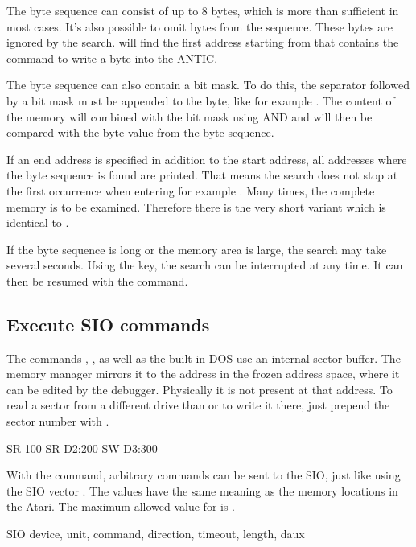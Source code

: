 The byte sequence can consist of up to 8 bytes, which is more than sufficient
in most cases. It's also possible to omit bytes from the sequence. These bytes
are ignored by the search.
 will find the first address starting from  that
contains the command  to write a byte into the ANTIC.

The byte sequence can also contain a bit mask. To do this, the separator
\fcmd{\&} followed by a bit mask must be appended to the byte, like for example
. The content of the memory will combined with the bit mask using
AND and will then be compared with the byte value from the byte sequence.

If an end address is specified in addition to the start address, all addresses
where the byte sequence is found are printed. That means the search does not
stop at the first occurrence when entering for example
.
Many times, the complete memory is to be examined. Therefore there is the very short
variant  which is identical to
.

If the byte sequence is long or the memory area is large, the search may take
several seconds. Using the  key, the search can be interrupted at
any time. It can then be resumed with the \fcmd{/} command.

\subsection{Execute SIO commands}

The commands , ,  as well as the built-in DOS use an
internal sector buffer. The memory manager mirrors it to the address 
in the frozen address space, where it can be edited by the debugger.
Physically it is not present at that address. To read a sector from a different
drive than  or to write it there, just prepend the sector number with
.
\begin{fcode}
SR 100
SR D2:200
SW D3:300
\end{fcode}

With the  command, arbitrary commands can be sent to the SIO, just
like using the SIO vector . The values have the same meaning as the
memory locations  in the Atari. The maximum allowed
value for  is .

\begin{fcode}
SIO device, unit, command, direction, timeout, length, daux
\end{fcode} 

